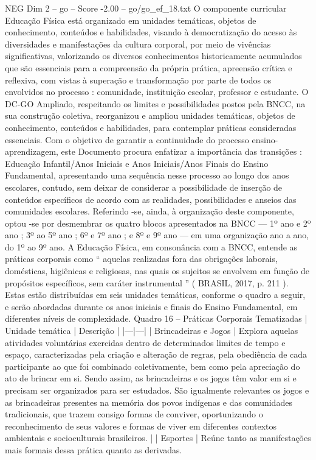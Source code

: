\begin{textsample}{NEG Dim 2 – go – Score -2.00 – go/go\_ef\_18.txt}  \label{ex:f2_neg_117}
O componente curricular Educação Física está organizado em unidades temáticas, objetos de conhecimento, conteúdos e habilidades, visando à democratização do acesso às diversidades e manifestações da cultura corporal, por meio de vivências significativas, valorizando os diversos conhecimentos historicamente acumulados que são essenciais para a compreensão da própria prática, apreensão crítica e reflexiva, com vistas à superação e transformação por parte de todos os envolvidos no processo : comunidade, instituição escolar, professor e estudante.
O DC-GO Ampliado, respeitando os limites e possibilidades postos pela BNCC, na sua construção coletiva, reorganizou e ampliou unidades temáticas, objetos de conhecimento, conteúdos e habilidades, para contemplar práticas consideradas essenciais.
Com o objetivo de garantir a continuidade do processo ensino-aprendizagem, este Documento procura enfatizar a importância das transições : Educação Infantil/Anos Iniciais e Anos Iniciais/Anos Finais do Ensino Fundamental, apresentando uma sequência nesse processo ao longo dos anos escolares, contudo, sem deixar de considerar a possibilidade de inserção de conteúdos específicos de acordo com as realidades, possibilidades e anseios das comunidades escolares.
Referindo -se, ainda, à organização deste componente, optou -se por desmembrar os quatro blocos apresentados na BNCC — 1º ano e 2º ano ; 3º ao 5º ano ; 6º e 7º ano ; e 8º e 9º ano — em uma organização ano a ano, do 1º ao 9º ano.
A Educação Física, em consonância com a BNCC, entende as práticas corporais como “ aquelas realizadas fora das obrigações laborais, domésticas, higiênicas e religiosas, nas quais os sujeitos se envolvem em função de propósitos específicos, sem caráter instrumental ” ( BRASIL, 2017, p. 211 ).
Estas estão distribuídas em seis unidades temáticas, conforme o quadro a seguir, e serão abordadas durante os anos iniciais e finais do Ensino Fundamental, em diferentes níveis de complexidade.
Quadro 16 – Práticas Corporais Tematizadas | Unidade temática | Descrição | |---|---| | Brincadeiras e Jogos | Explora aquelas atividades voluntárias exercidas dentro de determinados limites de tempo e espaço, caracterizadas pela criação e alteração de regras, pela obediência de cada participante ao que foi combinado coletivamente, bem como pela apreciação do ato de brincar em si.
Sendo assim, as brincadeiras e os jogos têm valor em si e precisam ser organizados para ser estudados.
São igualmente relevantes os jogos e as brincadeiras presentes na memória dos povos indígenas e das comunidades tradicionais, que trazem consigo formas de conviver, oportunizando o reconhecimento de seus valores e formas de viver em diferentes contextos ambientais e socioculturais brasileiros. | | Esportes | Reúne tanto as manifestações mais formais dessa prática quanto as derivadas.

\end{textsample}
